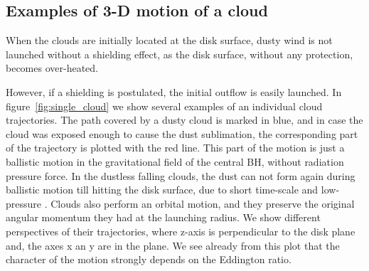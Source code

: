\documentclass[twocolumn]{aastex62}
\begin{document}
\subsection{Examples of 3-D motion of a cloud}
\label{sect:3D}

When the clouds are initially located at the disk surface, dusty wind is not launched without a shielding effect, as the disk surface, without any protection, becomes over-heated.

However, if a shielding is postulated, the initial outflow is easily launched. In figure~\ref{fig:single_cloud} we show several examples of an individual cloud trajectories. The path covered by a dusty cloud is marked in blue, and in case the cloud was exposed enough to cause the dust sublimation, the corresponding part of the trajectory is plotted with the red line. This part of the motion is just a ballistic motion in the gravitational field of the central BH, without radiation pressure force. 
In the dustless falling clouds, the dust can not form again during ballistic motion till hitting the disk surface, due to short time-scale and low-pressure \citep{elvis2002}.
Clouds also perform an orbital motion, and they preserve the original angular momentum they had at the launching radius. We show different perspectives of their trajectories, where z-axis is perpendicular to the disk plane and, the axes x an y are in the plane. We see already from this plot that the character of the motion strongly depends on the Eddington ratio.
\end{document}
